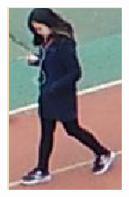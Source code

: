 \begin{figure}[h]
\begin{subfigure}[h]{0.11\textwidth}
        \includegraphics[width=\textwidth]{figures/样本标注示例4.png}
    \end{subfigure}
    ~ %
    \begin{subfigure}[h]{0.11\textwidth}

\end{subfigure}
\end{figure}
